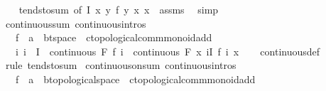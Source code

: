 \begin{isabellebody}
\ \ %
\endisadelimproof
%
\isatagproof
{}\isamarkupfalse%
\ tendsto{\isacharunderscore}{\kern0pt}sum\ {\isacharbrackleft}{\kern0pt}of\ I\ {\isachardoublequoteopen}{\isasymlambda}x\ y{\isachardot}{\kern0pt}\ f\ y\ x{\isachardoublequoteclose}\ {\isachardoublequoteopen}{\isasymlambda}x{\isachardot}{\kern0pt}\ {}{\isachardoublequoteclose}{\isacharbrackright}{\kern0pt}\ assms\ \isamarkupfalse%
\ simp%
\endisatagproof
{\isafoldproof}%
%
\isadelimproof
\isanewline
%
\endisadelimproof
\isanewline
{}\isamarkupfalse%
\ continuous{\isacharunderscore}{\kern0pt}sum\ {\isacharbrackleft}{\kern0pt}continuous{\isacharunderscore}{\kern0pt}intros{\isacharbrackright}{\kern0pt}{\isacharcolon}{\kern0pt}\isanewline
\ \ \ f\ {\isacharcolon}{\kern0pt}{\isacharcolon}{\kern0pt}\ {\isachardoublequoteopen}{\isacharprime}{\kern0pt}a\ {\isasymRightarrow}\ {\isacharprime}{\kern0pt}b{\isacharcolon}{\kern0pt}{\isacharcolon}{\kern0pt}t{}{\isacharunderscore}{\kern0pt}space\ {\isasymRightarrow}\ {\isacharprime}{\kern0pt}c{\isacharcolon}{\kern0pt}{\isacharcolon}{\kern0pt}topological{\isacharunderscore}{\kern0pt}comm{\isacharunderscore}{\kern0pt}monoid{\isacharunderscore}{\kern0pt}add{\isachardoublequoteclose}\isanewline
\ \ \ {\isachardoublequoteopen}{\isacharparenleft}{\kern0pt}{\isasymAnd}i{\isachardot}{\kern0pt}\ i\ {\isasymin}\ I\ {\isasymLongrightarrow}\ continuous\ F\ {\isacharparenleft}{\kern0pt}f\ i{\isacharparenright}{\kern0pt}{\isacharparenright}{\kern0pt}\ {\isasymLongrightarrow}\ continuous\ F\ {\isacharparenleft}{\kern0pt}{\isasymlambda}x{\isachardot}{\kern0pt}\ {\isasymSum}i{\isasymin}I{\isachardot}{\kern0pt}\ f\ i\ x{\isacharparenright}{\kern0pt}{\isachardoublequoteclose}\isanewline
%
\isadelimproof
\ \ %
\endisadelimproof
%
\isatagproof
{}\isamarkupfalse%
\ continuous{\isacharunderscore}{\kern0pt}def\ \isamarkupfalse%
\ {\isacharparenleft}{\kern0pt}rule\ tendsto{\isacharunderscore}{\kern0pt}sum{\isacharparenright}{\kern0pt}%
\endisatagproof
{\isafoldproof}%
%
\isadelimproof
\isanewline
%
\endisadelimproof
\isanewline
{}\isamarkupfalse%
\ continuous{\isacharunderscore}{\kern0pt}on{\isacharunderscore}{\kern0pt}sum\ {\isacharbrackleft}{\kern0pt}continuous{\isacharunderscore}{\kern0pt}intros{\isacharbrackright}{\kern0pt}{\isacharcolon}{\kern0pt}\isanewline
\ \ \ f\ {\isacharcolon}{\kern0pt}{\isacharcolon}{\kern0pt}\ {\isachardoublequoteopen}{\isacharprime}{\kern0pt}a\ {\isasymRightarrow}\ {\isacharprime}{\kern0pt}b{\isacharcolon}{\kern0pt}{\isacharcolon}{\kern0pt}topological{\isacharunderscore}{\kern0pt}space\ {\isasymRightarrow}\ {\isacharprime}{\kern0pt}c{\isacharcolon}{\kern0pt}{\isacharcolon}{\kern0pt}topological{\isacharunderscore}{\kern0pt}comm{\isacharunderscore}{\kern0pt}monoid{\isacharunderscore}{\kern0pt}add{\isachardoublequoteclose}\isanewline

\end{isabellebody}
